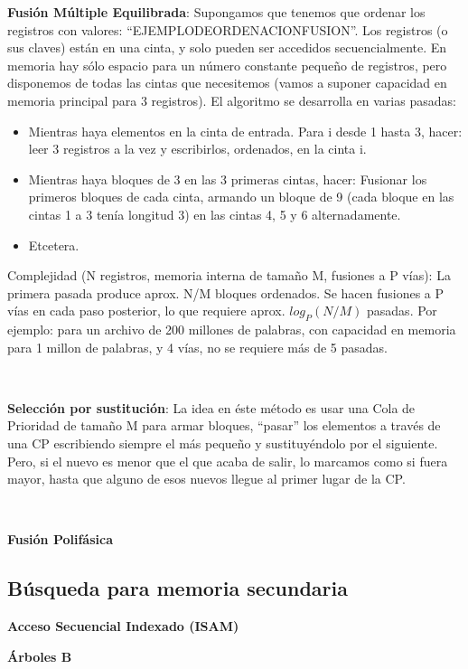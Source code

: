 \textbf{Fusi\'on M\'ultiple Equilibrada}: Supongamos que tenemos que ordenar los registros con valores: ``EJEMPLODEORDENACIONFUSION''.
Los registros (o sus claves) est\'an en una cinta, y solo pueden ser accedidos secuencialmente. En memoria hay s\'olo espacio para un n\'umero constante pequeño de registros, pero disponemos de todas las cintas que necesitemos (vamos a suponer capacidad en memoria principal para 3 registros).
El algoritmo se desarrolla en varias pasadas:
 \begin{itemize}
  \item Mientras haya elementos en la cinta de entrada. Para i desde 1 hasta 3, hacer: leer 3 registros a la vez y escribirlos, ordenados, en la cinta i.
  \item Mientras haya bloques de 3 en las 3 primeras cintas, hacer: Fusionar los primeros bloques de cada cinta, armando un bloque de 9 (cada bloque en las cintas 1 a 3 ten\'ia longitud 3) en las cintas 4, 5 y 6 alternadamente.
  \item Etcetera.
 \end{itemize}

 Complejidad (N registros, memoria interna de tamaño M, fusiones a P v\'ias): La primera pasada produce aprox. N/M bloques ordenados. Se hacen fusiones a P v\'ias en cada paso posterior, lo que requiere aprox. $log_P(N/M)$ pasadas.
 Por ejemplo: para un archivo de 200 millones de palabras, con capacidad en memoria para 1 millon de palabras, y 4 v\'ias, no se requiere m\'as de 5 pasadas.

~

\textbf{Selecci\'on por sustituci\'on}: La idea en \'este m\'etodo es usar una Cola de Prioridad de tamaño M para armar bloques, ``pasar'' los elementos a trav\'es de una CP escribiendo siempre el m\'as pequeño y sustituy\'endolo por el siguiente. Pero, si el nuevo es menor que el que acaba de salir, lo marcamos como si fuera mayor, hasta que alguno de esos nuevos llegue al primer lugar de la CP.

~

\textbf{Fusi\'on Polif\'asica}

\subsection{B\'usqueda para memoria secundaria}

\textbf{Acceso Secuencial Indexado (ISAM)}

\textbf{\'Arboles B}

